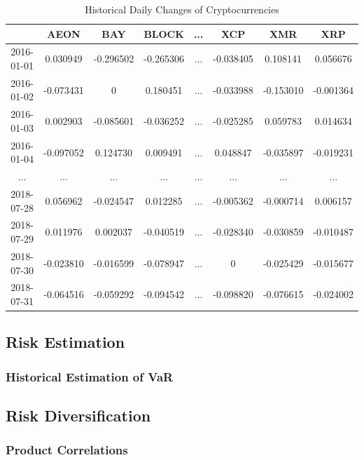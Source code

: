 \documentclass[11pt]{article} %
\theoremstyle{plain}
\theoremstyle{definition}
\begin{document}
{
  \begin{table}[ht]
    \centering
    \scriptsize
    \begin{tabular}{|c|c c c c c c c|}
      \hline
       & AEON & BAY & BLOCK & ... & XCP & XMR & XRP \\ [0.5ex]
      \hline
      2016-01-01 & 0.030949 & -0.296502 & -0.265306 & ... & -0.038405 & 0.108141 & 0.056676 \\
      \hline
      2016-01-02 & -0.073431 & 0 & 0.180451 & ... & -0.033988 & -0.153010 & 	-0.001364 \\
      \hline
      2016-01-03 & 0.002903 & -0.085601 & -0.036252 & ... & -0.025285 & 0.059783 & 0.014634 \\
      \hline
      2016-01-04 & -0.097052 & 0.124730 & 0.009491 & ... & 0.048847 & -0.035897 & -0.019231 \\
      \hline
      ... & ... & ... & ... & ... & ... & ... & ... \\
      \hline
      2018-07-28 & 0.056962 & -0.024547 & 0.012285 & ... & -0.005362 & -0.000714 & 0.006157 \\
      \hline
      2018-07-29 & 0.011976 & 0.002037 & -0.040519 & ... & -0.028340 & -0.030859 & -0.010487 \\
      \hline
      2018-07-30 & -0.023810 & -0.016599 & -0.078947 & ... & 0 & -0.025429 & -0.015677 \\
      \hline
      2018-07-31 & -0.064516 & -0.059292 & -0.094542 & ... & -0.098820 & -0.076615 & -0.024002 \\
      \hline
    \end{tabular}
    \caption{Historical Daily Changes of Cryptocurrencies}
    \label{table:dccrypto}
  \end{table}
}

\subsection{Risk Estimation}
\subsubsection{Historical Estimation of VaR}
\subsection{Risk Diversification}
\subsubsection{Product Correlations}
\end{document}
